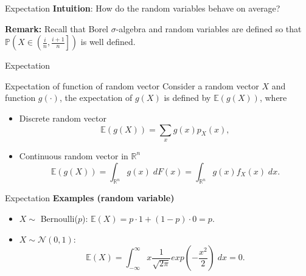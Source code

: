 \documentclass [aspectratio=169]{beamer}
\begin{document}
\begin{frame}{Expectation}
\textbf{Intuition}: How do the random variables behave on average?\\
\uncover<2->{
\begin{block}{Measure theoretic definition of Expectation (informal)}
Consider a random variable $X$ , the expectation of $X$ is defined by $\mathbb{E}(X)$, where 

\[
\mathbb{E}(X) = \lim_{n\to \infty} \sum_{i=-\infty}^\infty \frac{i}{n}\mathbb{P}\left(X \in \left(\frac{i}{n}, \frac{i+1}{n}\right]\right).
\]
\end{block}}

\textbf{Remark:} Recall that Borel $\sigma$-algebra and random variables are defined so that $\mathbb{P}\left(X \in \left(\frac{i}{n}, \frac{i+1}{n}\right]\right)$ is well defined.
\end{frame}


\begin{frame}{Expectation}

\begin{block}{Expectation of function of random vector}
Consider a random vector $X$ and function $g(\cdot)$, the expectation of $g(X)$ is defined by $\mathbb{E}(g(X))$, where 
\begin{itemize}
    \item Discrete random vector
    $$
    \mathbb{E}(g(X)) = \sum_{x}g(x)p_X(x),
    $$
    \item Continuous random vector in $\mathbb{R}^n$
    $$
    \mathbb{E}(g(X)) = \int_{\mathbb{R}^n} g(x)\;dF(x) = \int_{\mathbb{R}^n} g(x)f_X(x)\;dx.
    $$
\end{itemize}
\end{block}
\end{frame}

\begin{frame}{Expectation}
    \textbf{Examples (random variable)}
    \begin{itemize}
        \item $X \sim $ Bernoulli($p$): $\mathbb{E}(X) = p\cdot 1 + (1-p)\cdot 0 = p$.
        \item $X \sim \mathcal{N}(0, 1)$: 
        $$
        \mathbb{E}(X) = \int_{-\infty}^{\infty}x 
        \frac{1}{\sqrt{2\pi}}exp(-\frac{x^2}{2})\; dx = 0.
        $$
    \end{itemize}
    \vspace{0.1in}
\end{frame}
\end{document}
